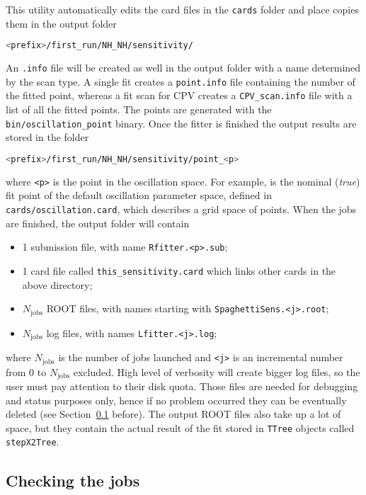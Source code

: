 \documentclass[a4paper, 11pt]{article}
\newcommand{\refsec}[1]{Section~\ref{#1}}
\begin{document}
This utility automatically edits the card files in the \texttt{cards} folder and place copies them %
in the output folder
\begin{lstlisting}[language=bash]
    <prefix>/first_run/NH_NH/sensitivity/
\end{lstlisting}
An \texttt{.info} file will be created as well in the output folder with a name determined %
by the scan type.
A single fit creates a \texttt{point.info} file containing the number of the fitted point, %
whereas a fit scan for CPV creates a \texttt{CPV\_scan.info} file with a list of all the %
fitted points.
The points are generated with the \texttt{bin/oscillation\_point} binary.
Once the fitter is finished the output results are stored in the folder %
\begin{lstlisting}[language=bash]
    <prefix>/first_run/NH_NH/sensitivity/point_<p>
\end{lstlisting}
where \texttt{<p>} is the point in the oscillation space.
For example,  is the nominal (\emph{true}) fit point of the default oscillation %
parameter space, defined in \texttt{cards/oscillation.card}, %
which describes a grid space of  points.
When the jobs are finished, the output folder will contain
\begin{itemize}
		\small
	\item 1 submission file, with name \texttt{Rfitter.<p>.sub};
	\item 1 card file called \texttt{this\_sensitivity.card} which links other cards %
		in the above directory;
	\item $N_\text{jobs}$ ROOT files, with names starting with \texttt{SpaghettiSens.<j>.root};
	\item $N_\text{jobs}$ log files, with names \texttt{Lfitter.<j>.log};
\end{itemize}
where $N_\text{jobs}$ is the number of jobs launched and \texttt{<j>} is an incremental number %
from 0 to $N_\text{jobs}$ excluded.
High level of verbosity will create bigger log files, so the user must pay attention to their disk quota.
Those files are needed for debugging and status purposes only, %
hence if no problem occurred they can be eventually deleted (see \refsec{sec:complete} before).
The output ROOT files also take up a lot of space, but they contain the actual result of the fit %
stored in \texttt{TTree} objects called \texttt{stepX2Tree}.

\subsection{Checking the jobs}
\label{sec:complete}
\end{document}
